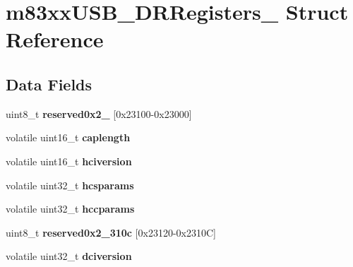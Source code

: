 \hypertarget{structm83xxUSB__DRRegisters__}{}\section{m83xx\+U\+S\+B\+\_\+\+D\+R\+Registers\+\_\+ Struct Reference}
\label{structm83xxUSB__DRRegisters__}
\subsection*{Data Fields}
\begin{DoxyCompactItemize}
\item 
\mbox{\label{structm83xxUSB__DRRegisters___a73e5b7037ad83a606ea2cc5dc8a42ce1}} 
uint8\+\_\+t {\bfseries reserved0x2\+\_} \mbox{[}0x23100-\/0x23000\mbox{]}
\item 
\mbox{\label{structm83xxUSB__DRRegisters___adbe06cbfafeb94184eaeaf8e9a5465fb}} 
volatile uint16\+\_\+t {\bfseries caplength}
\item 
\mbox{\label{structm83xxUSB__DRRegisters___a946456701097925b98ecd2118fa7e8e7}} 
volatile uint16\+\_\+t {\bfseries hciversion}
\item 
\mbox{\label{structm83xxUSB__DRRegisters___a9d136c60f1d2ea4420dd2c4f09786f13}} 
volatile uint32\+\_\+t {\bfseries hcsparams}
\item 
\mbox{\label{structm83xxUSB__DRRegisters___a1712196adae4319a6718026fd76c430e}} 
volatile uint32\+\_\+t {\bfseries hccparams}
\item 
\mbox{\label{structm83xxUSB__DRRegisters___acd51cf1d0561b6ca4f815a3d4de6a558}} 
uint8\+\_\+t {\bfseries reserved0x2\+\_\+310c} \mbox{[}0x23120-\/0x2310\+C\mbox{]}
\item 
\mbox{\label{structm83xxUSB__DRRegisters___ad702fc392e8896105a66f3c267d3d87d}} 
volatile uint32\+\_\+t {\bfseries dciversion}
\item 
\mbox{\label{structm83xxUSB__DRRegisters___ab3cf9c19e85c600cd0f9a2601a6d2c22}} 

\end{DoxyCompactItemize}
